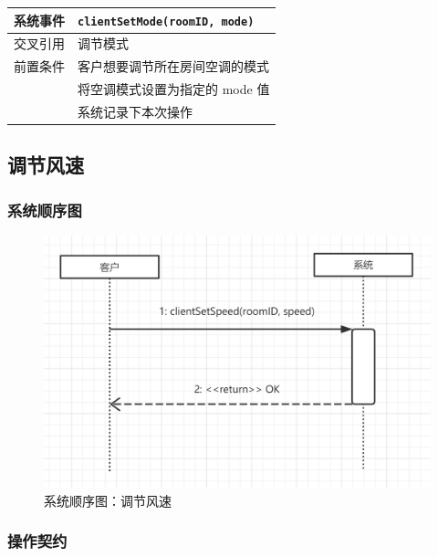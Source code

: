 \documentclass[black,normal,cn]{elegantnote}
\newcommand{\code}[1]{\colorbox{light-gray}{\texttt{#1}}}
\begin{document}
\begin{center}
    \begin{tabular}{|>{\centering}m{}|m{}|}
        \hline
        系统事件 & \multicolumn{1}{l|}{\code{clientSetMode(roomID, mode)}} \\
        \hline
        交叉引用 & 调节模式                                                \\
        \hline
        前置条件 & 客户想要调节所在房间空调的模式                          \\
        \hline
        \multirow{3}{*}{后置条件}
                 & 将空调模式设置为指定的 mode 值                          \\
        \cline{2-2}
                 & 系统记录下本次操作                                      \\
        \hline
    \end{tabular}
\end{center}


\subsection{调节风速}

\subsubsection{系统顺序图}

\begin{figure}[H]
    \centering
    \includegraphics[width=.8\textwidth]{fig/250005.png}
    \caption{系统顺序图：调节风速}
    \label{fig:250005}
\end{figure}

\subsubsection{操作契约}
\end{document}
